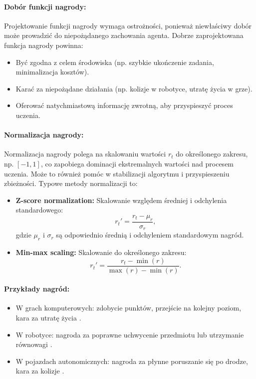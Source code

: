 \paragraph{Dobór funkcji nagrody:}
Projektowanie funkcji nagrody wymaga ostrożności, ponieważ niewłaściwy dobór może prowadzić do niepożądanego zachowania agenta. Dobrze zaprojektowana funkcja nagrody powinna:
\begin{itemize}
	\item Być zgodna z celem środowiska (np. szybkie ukończenie zadania, minimalizacja kosztów).
	\item Karać za niepożądane działania (np. kolizje w robotyce, utratę życia w grze).
	\item Oferować natychmiastową informację zwrotną, aby przyspieszyć proces uczenia.
\end{itemize}

\paragraph{Normalizacja nagrody:}
Normalizacja nagrody polega na skalowaniu wartości \(r_t\) do określonego zakresu, np. \([-1, 1]\), co zapobiega dominacji ekstremalnych wartości nad procesem uczenia. Może to również pomóc w stabilizacji algorytmu i przyspieszeniu zbieżności. Typowe metody normalizacji to:
\begin{itemize}
	\item \textbf{Z-score normalization:} Skalowanie względem średniej i odchylenia standardowego:
	      \[
		      r_t' = \frac{r_t - \mu_r}{\sigma_r},
	      \]
	      gdzie \(\mu_r\) i \(\sigma_r\) są odpowiednio średnią i odchyleniem standardowym nagród.
	\item \textbf{Min-max scaling:} Skalowanie do określonego zakresu:
	      \[
		      r_t' = \frac{r_t - \min(r)}{\max(r) - \min(r)}.
	      \]
\end{itemize}

\paragraph{Przykłady nagród:}
\begin{itemize}
	\item W grach komputerowych: zdobycie punktów, przejście na kolejny poziom, kara za utratę życia \cite{BELLEMARE2013}.
	\item W robotyce: nagroda za poprawne uchwycenie przedmiotu lub utrzymanie równowagi \cite{TODOROV2012}.
	\item W pojazdach autonomicznych: nagroda za płynne poruszanie się po drodze, kara za kolizje \cite{DOSOVITSKIY2017}.
\end{itemize}
